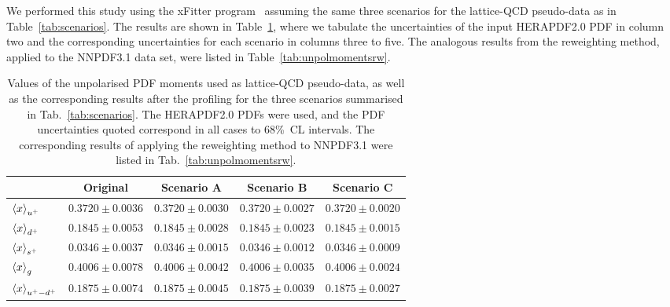 We performed this study using the xFitter program~\cite{Alekhin:2014irh}
assuming the same three scenarios for the lattice-QCD pseudo-data as 
in Table~\ref{tab:scenarios}. 
%
The results are shown in Table~\ref{tab:unpolmomentsProf}, where we tabulate 
the uncertainties of the input HERAPDF2.0 PDF in column two and the 
corresponding uncertainties for each scenario in columns three to five. 
%
The analogous results from the reweighting method, applied to the 
NNPDF3.1 data set, were listed in Table~\ref{tab:unpolmomentsrw}.

\begin{table}[!t]
\centering
\footnotesize
\renewcommand{\arraystretch}{1.3} 
\begin{tabular}{lcccc}
\toprule 
&  Original  & Scenario A  &  Scenario B  &  Scenario C  \\
\midrule
  $\left\langle x\right\rangle_{u^+}$     
&  $0.3720\pm 0.0036$  
&  $0.3720\pm 0.0030$  
&  $0.3720\pm 0.0027$  
&  $0.3720\pm 0.0020$ \\
  $\left\langle x\right\rangle_{d^+}$     
&  $0.1845\pm 0.0053$  
&  $0.1845\pm 0.0028$  
&  $0.1845\pm 0.0023$  
&  $0.1845\pm 0.0015$ \\
  $\left\langle x\right\rangle_{s^+}$     
&  $0.0346\pm 0.0037$  
&  $0.0346\pm 0.0015$  
&  $0.0346\pm 0.0012$  
&  $0.0346\pm 0.0009$ \\
  $\left\langle x\right\rangle_{g}$       
&  $0.4006\pm 0.0078$  
&  $0.4006\pm 0.0042$  
&  $0.4006\pm 0.0035$  
&  $0.4006\pm 0.0024$ \\
  $\left\langle x\right\rangle_{u^+-d^+}$ 
&  $0.1875\pm 0.0074$  
&  $0.1875\pm 0.0045$  
&  $0.1875\pm 0.0039$  
&  $0.1875\pm 0.0027$ \\
\bottomrule
\end{tabular}
\caption{\small Values of the unpolarised PDF moments
  used as lattice-QCD pseudo-data, as well as the corresponding results
  after the profiling  for the
three scenarios summarised in Tab.~\ref{tab:scenarios}.
%
The HERAPDF2.0 PDFs were used, and the PDF uncertainties quoted correspond in all cases to 68\%~CL intervals.
%
The corresponding results of applying the reweighting method
to NNPDF3.1 were listed in Tab.~\ref{tab:unpolmomentsrw}.
\label{tab:unpolmomentsProf}
}
\end{table}

